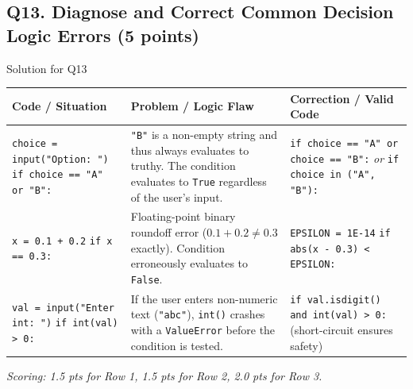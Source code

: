 \documentclass[11pt,a4paper]{article}
\begin{document}
\subsection*{Q13. Diagnose and Correct Common Decision Logic Errors (5 points)}
\begin{solbox}{Solution for Q13}
\renewcommand{\arraystretch}{1.3}
\begin{tabularx}{\textwidth}{|p{4.5cm}|X|X|}
\hline
\textbf{Code / Situation} & \textbf{Problem / Logic Flaw} & \textbf{Correction / Valid Code} \\
\hline
\texttt{choice = input("Option: ")}\newline
\texttt{if choice == "A" or "B":} &
\texttt{"B"} is a non-empty string and thus always evaluates to truthy. The condition evaluates to \texttt{True} regardless of the user's input. &
\texttt{if choice == "A" or choice == "B":}\newline
\textit{or} \texttt{if choice in ("A", "B"):} \\
\hline
\texttt{x = 0.1 + 0.2}\newline
\texttt{if x == 0.3:} &
Floating-point binary roundoff error ($0.1 + 0.2 \ne 0.3$ exactly). Condition erroneously evaluates to \texttt{False}. &
\texttt{EPSILON = 1E-14}\newline
\texttt{if abs(x - 0.3) < EPSILON:} \\
\hline
\texttt{val = input("Enter int: ")}\newline
\texttt{if int(val) > 0:} &
If the user enters non-numeric text (\texttt{"abc"}), \texttt{int()} crashes with a \texttt{ValueError} before the condition is tested. &
\texttt{if val.isdigit() and int(val) > 0:}\newline
(short-circuit ensures safety) \\
\hline
\end{tabularx}
\textit{Scoring: 1.5 pts for Row 1, 1.5 pts for Row 2, 2.0 pts for Row 3.}
\end{solbox}
\end{document}
